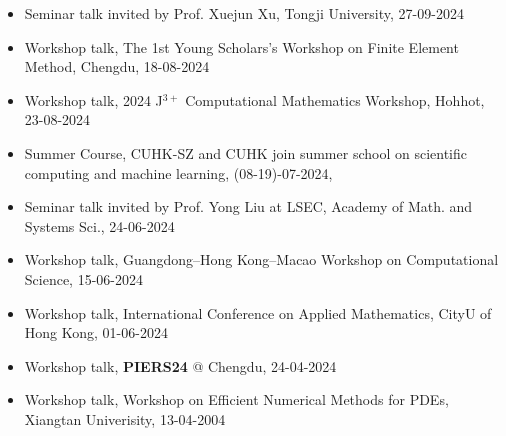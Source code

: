 \documentclass[letterpaper]{article}
\begin{document}
\begin{itemize}[leftmargin=*]
\item Seminar talk invited  by Prof. Xuejun Xu, Tongji University, 27-09-2024

\item Workshop talk, {The 1st Young Scholars's Workshop on Finite Element Method}, Chengdu, 18-08-2024

\item Workshop talk, 2024 J$^{3+}$ Computational Mathematics  Workshop, Hohhot, 23-08-2024


\item Summer Course, CUHK-SZ and CUHK join summer school on scientific computing and machine learning, (08-19)-07-2024,

\item Seminar talk invited by Prof. Yong Liu at LSEC, Academy of Math. and Systems Sci., 24-06-2024

\item Workshop talk,  Guangdong–Hong Kong–Macao Workshop on Computational Science, 15-06-2024




\item Workshop talk, International Conference on Applied Mathematics, CityU of Hong Kong, 01-06-2024


\item Workshop talk, {\bf PIERS24} @ Chengdu, 24-04-2024

\item Workshop talk, Workshop on Efficient Numerical Methods for PDEs, Xiangtan Univerisity, 13-04-2004



\end{itemize}
\end{document}
